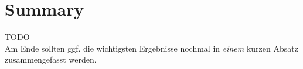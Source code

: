 \section{Summary}
\label{ch:Analyse:sec:Summary}

TODO\\

Am Ende sollten ggf. die wichtigsten Ergebnisse nochmal in \emph{einem}
kurzen Absatz zusammengefasst werden.


